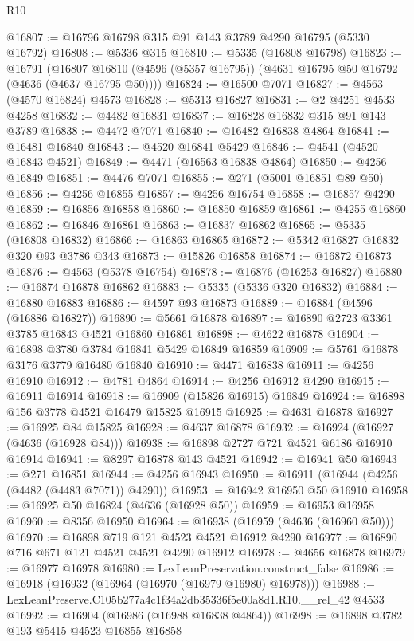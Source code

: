 \begin{lexlean}{R10}
\begin{coremodule}
@16807 := @16796 @16798 @315 @91 @143 @3789 @4290 @16795 (@5330 @16792)
@16808 := @5336 @315
@16810 := @5335 (@16808 @16798)
@16823 := @16791
    (@16807 @16810 (@4596 (@5357 @16795)) (@4631 @16795 @50 @16792 (@4636 (@4637 @16795 @50))))
@16824 := @16500 @7071
@16827 := @4563 (@4570 @16824) @4573
@16828 := @5313 @16827
@16831 := @2 @4251 @4533 @4258
@16832 := @4482 @16831
@16837 := @16828 @16832 @315 @91 @143 @3789
@16838 := @4472 @7071
@16840 := @16482 @16838 @4864
@16841 := @16481 @16840
@16843 := @4520 @16841 @5429
@16846 := @4541 (@4520 @16843 @4521)
@16849 := @4471 (@16563 @16838 @4864)
@16850 := @4256 @16849
@16851 := @4476 @7071
@16855 := @271 (@5001 @16851 @89 @50)
@16856 := @4256 @16855
@16857 := @4256 @16754
@16858 := @16857 @4290
@16859 := @16856 @16858
@16860 := @16850 @16859
@16861 := @4255 @16860
@16862 := @16846 @16861
@16863 := @16837 @16862
@16865 := @5335 (@16808 @16832)
@16866 := @16863 @16865
@16872 := @5342 @16827 @16832 @320 @93 @3786 @343
@16873 := @15826 @16858
@16874 := @16872 @16873
@16876 := @4563 (@5378 @16754)
@16878 := @16876 (@16253 @16827)
@16880 := @16874 @16878 @16862
@16883 := @5335 (@5336 @320 @16832)
@16884 := @16880 @16883
@16886 := @4597 @93 @16873
@16889 := @16884 (@4596 (@16886 @16827))
@16890 := @5661 @16878
@16897 := @16890 @2723 @3361 @3785 @16843 @4521 @16860 @16861
@16898 := @4622 @16878
@16904 := @16898 @3780 @3784 @16841 @5429 @16849 @16859
@16909 := @5761 @16878 @3176 @3779 @16480 @16840
@16910 := @4471 @16838
@16911 := @4256 @16910
@16912 := @4781 @4864
@16914 := @4256 @16912 @4290
@16915 := @16911 @16914
@16918 := @16909 (@15826 @16915) @16849
@16924 := @16898 @156 @3778 @4521 @16479 @15825 @16915
@16925 := @4631 @16878
@16927 := @16925 @84 @15825
@16928 := @4637 @16878
@16932 := @16924 (@16927 (@4636 (@16928 @84)))
@16938 := @16898 @2727 @721 @4521 @6186 @16910 @16914
@16941 := @8297 @16878 @143 @4521
@16942 := @16941 @50
@16943 := @271 @16851
@16944 := @4256 @16943
@16950 := @16911 (@16944 (@4256 (@4482 (@4483 @7071)) @4290))
@16953 := @16942 @16950 @50 @16910
@16958 := @16925 @50 @16824 (@4636 (@16928 @50))
@16959 := @16953 @16958
@16960 := @8356 @16950
@16964 := @16938 (@16959 (@4636 (@16960 @50)))
@16970 := @16898 @719 @121 @4523 @4521 @16912 @4290
@16977 := @16890 @716 @671 @121 @4521 @4521 @4290 @16912
@16978 := @4656 @16878
@16979 := @16977 @16978
@16980 := LexLeanPreservation.construct_false
@16986 := @16918 (@16932 (@16964 (@16970 (@16979 @16980) @16978)))
@16988 := LexLeanPreserve.C105b277a4c1f34a2db35336f5e00a8d1.R10.__rel_42 @4533
@16992 := @16904 (@16986 (@16988 @16838 @4864))
@16998 := @16898 @3782 @193 @5415 @4523 @16855 @16858

\end{coremodule}
\end{lexlean}
